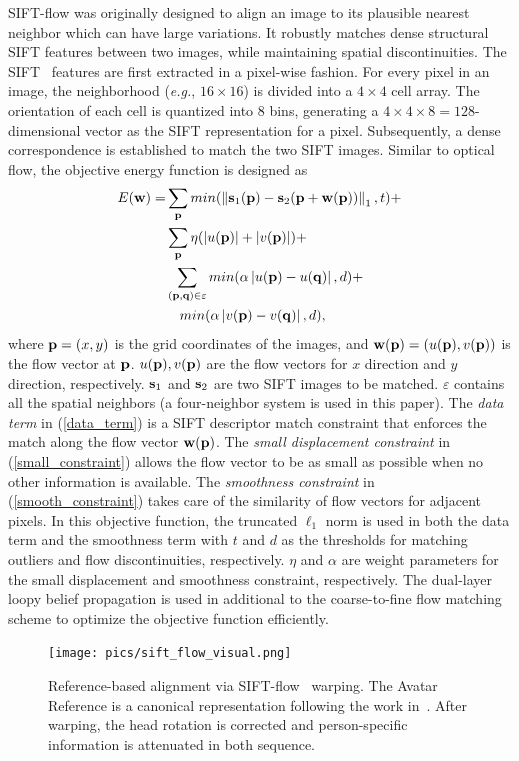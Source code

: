 \documentclass[journal]{IEEEtran}
\begin{document}
SIFT-flow was originally designed to align an image to its plausible nearest neighbor which can have large variations. It robustly matches dense structural SIFT features between two images, while maintaining spatial discontinuities. The SIFT~\cite{Lowe_ICCV99} features are first extracted in a pixel-wise fashion. For every pixel in an image, the neighborhood (\textit{e.g.}, $16\times16$) is divided into a $4\times4$ cell array. The orientation of each cell is quantized into 8 bins, generating a $4\times4\times8=128$-dimensional vector as the SIFT representation for a pixel. Subsequently, a dense correspondence is established to match the two SIFT images. Similar to optical flow, the objective energy function is designed as
\begin{align}
	\label{data_term}
	E(\w)=&\sum_\p min(\left\|\s_1 (\p)-\s_2 (\p+\w(\p))\right\|_1 ,t)+
\\\label{small_constraint}
&\sum_\p \eta(\left|u(\p)\right|+\left|v(\p)\right|) +
\\\nonumber
&\sum_{(\p,\q)\in\varepsilon} min(\alpha\left|u(\p)-u(\q)\right|,d)+
\\\label{smooth_constraint}
&~~~min(\alpha\left|v(\p)-v(\q)\right|,d),
\end{align}
where ${\bf p}=(x,y)$ is the grid coordinates of the images, and ${\bf w}({\bf p})=(u({\bf p}),v({\bf p}))$ is the flow vector at ${\bf p}$. $u({\bf p}),v({\bf p})$ are the flow vectors for $x$ direction and $y$ direction, respectively. ${\bf s}_1$ and ${\bf s}_2$ are two SIFT images to be matched. $\varepsilon$ contains all the spatial neighbors (a four-neighbor system is used in this paper). The \emph{data term} in (\ref{data_term}) is a SIFT descriptor match constraint that enforces the match along the flow vector ${\bf w}({\bf p})$. The \emph{small displacement constraint} in (\ref{small_constraint}) allows the flow vector to be as small as possible when no other information is available. The \emph{smoothness constraint} in (\ref{smooth_constraint}) takes care of the similarity of flow vectors for adjacent pixels. In this objective function, the truncated $\ell_1$ norm is used in both the data term and the smoothness term with $t$ and $d$ as the thresholds for matching outliers and flow discontinuities, respectively. $\eta$ and $\alpha$ are weight parameters for the small displacement and smoothness constraint, respectively. The dual-layer loopy belief propagation is used in additional to the coarse-to-fine flow matching scheme to optimize the objective function efficiently.

\begin{figure}[htbp]
	\centering
		\texttt{[image: pics/sift\_flow\_visual.png]}
	\caption{Reference-based alignment via SIFT-flow~\cite{Liu_PAMI11} warping. The Avatar Reference is a canonical representation following the work in~\cite{Yang_SMCB12}. After warping, the head rotation is corrected and person-specific information is attenuated in both sequence.}
	\label{fig:sift_flow_visual}
\end{figure}
\end{document}
